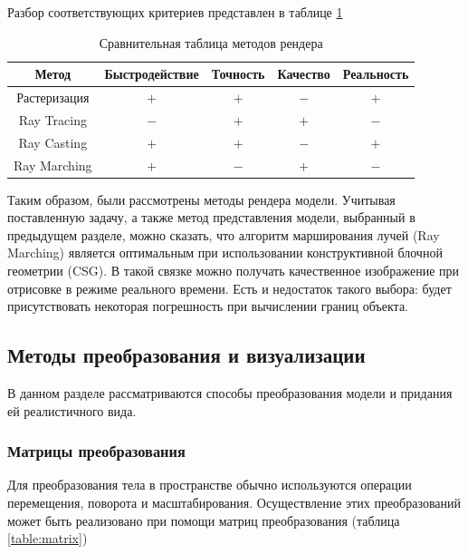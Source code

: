 Разбор соответствующих критериев представлен в таблице \ref{table:presentation}

\begin{table}[h]
	\begin{center}
		\captionsetup{justification=centering}
		\begin{tabular}{| c | c | c | c | c |}
			\hline
			Метод & Быстродействие & Точность & Качество & Реальность \\
			\hline
			Растеризация &$+$ & $+$ & $-$ & $+$\\
			\hline
			Ray Tracing & $-$ & $+$ & $+$ & $-$\\
			\hline
			Ray Casting  & $+$ & $+$ & $-$ & $+$\\
			\hline
			Ray Marching & $+$ & $-$ & $+$ & $-$\\
			\hline
		\end{tabular}
		\caption{Сравнительная таблица методов рендера}
		\label{table:presentation}
	\end{center}
\end{table}

Таким образом, были рассмотрены методы рендера модели.
Учитывая поставленную задачу, а также метод представления модели, выбранный в предыдущем разделе, можно сказать, что алгоритм марширования лучей (Ray Marching) является оптимальным при использовании конструктивной 
блочной геометрии (CSG). 
В такой связке можно получать качественное 
изображение при отрисовке в режиме реального времени.
Есть и недостаток такого выбора: будет присутствовать некоторая погрешность при вычислении границ объекта.

\subsection{Методы преобразования и визуализации}

В данном разделе рассматриваются способы преобразования модели и 
придания ей реалистичного вида.
\clearpage

\subsubsection{Матрицы преобразования}

Для преобразования тела в пространстве обычно используются операции 
перемещения, поворота и масштабирования.
Осуществление этих преобразований может быть реализовано при помощи матриц преобразования \cite{transformations} (таблица \ref{table:matrix})

